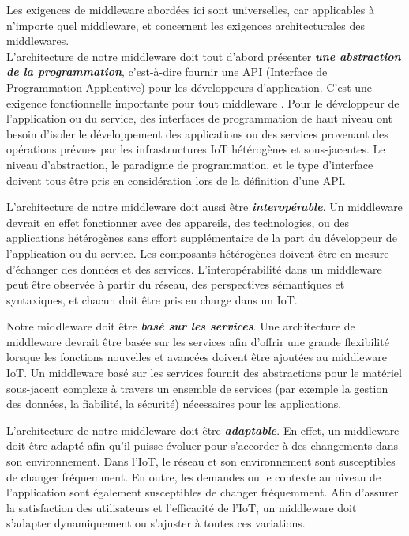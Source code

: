 Les exigences de middleware abordées ici sont universelles, car applicables à n'importe quel middleware, et concernent les exigences architecturales des middlewares.
\\

L'architecture de notre middleware doit tout d'abord présenter \textbf{\textit{une abstraction de la programmation}}, c'est-à-dire fournir une API (Interface de Programmation Applicative) pour les développeurs d'application. C'est une exigence fonctionnelle importante pour tout middleware \cite{IBM}. Pour le développeur de l'application ou du service, des interfaces de programmation de haut niveau ont besoin d'isoler le développement des applications ou des services provenant des opérations prévues par les infrastructures IoT hétérogènes et sous-jacentes. Le niveau d'abstraction, le paradigme de programmation, et le type d'interface doivent tous être pris en considération lors de la définition d'une API.

L'architecture de notre middleware doit aussi être \textbf{\textit{interopérable}}. Un middleware devrait en effet fonctionner avec des appareils, des technologies, ou des applications hétérogènes sans effort supplémentaire de la part du développeur de l'application ou du service. Les composants hétérogènes doivent être en mesure d'échanger des données et des services. L'interopérabilité dans un middleware peut être observée à partir du réseau, des perspectives sémantiques et syntaxiques, et chacun doit être pris en charge dans un IoT.

Notre middleware doit être \textbf{\textit{basé sur les services}}. Une architecture de middleware devrait être basée sur les services afin d’offrir une grande flexibilité lorsque les fonctions nouvelles et avancées doivent être ajoutées au middleware IoT. Un middleware basé sur les services fournit des abstractions pour le matériel sous-jacent complexe à travers un ensemble de services (par exemple la gestion des données, la fiabilité, la sécurité) nécessaires pour les applications.

L'architecture de notre middleware doit être \textbf{\textit{adaptable}}. En effet, un middleware doit être adapté afin qu'il puisse évoluer pour s'accorder à des changements dans son environnement. Dans l'IoT, le réseau et son environnement sont susceptibles de changer fréquemment. En outre, les demandes ou le contexte au niveau de l'application sont également susceptibles de changer fréquemment. Afin d'assurer la satisfaction des utilisateurs et l'efficacité de l'IoT, un middleware doit s’adapter dynamiquement ou s'ajuster à toutes ces variations.

